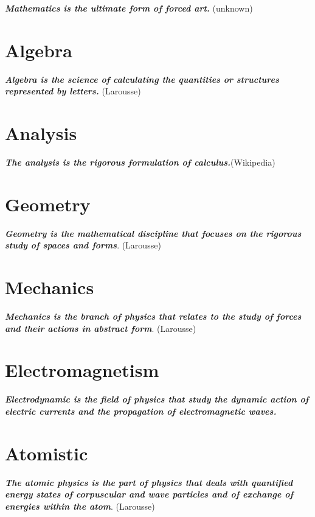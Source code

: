 \documentclass[12pt,a4paper,twoside,openright]{report}
\theoremstyle{definition}
\theoremstyle{itexmp}
\numberwithin{equation}{section}
\begin{document}
	\textit{\textbf{Mathematics is the ultimate form of forced art.}} (unknown)
	\minitoc
	
	
	
  \chapter{Algebra}

	\textit{\textbf{Algebra is the science of calculating the quantities or structures represented by letters.}} (Larousse)
	\minitoc
	
	
		
 \chapter{Analysis}

	\textit{\textbf{The analysis is the rigorous formulation of calculus.}}(Wikipedia)
	\minitoc
	\pagebreak
	
		
\chapter{Geometry}

	\textit{\textbf{Geometry is the mathematical discipline that focuses on the rigorous study of spaces and forms}}. (Larousse)
	\minitoc
	\pagebreak
	
	
   \chapter{Mechanics}

	\textit{\textbf{Mechanics is the branch of physics that relates to the study of forces and their actions in abstract form}}. (Larousse)
	\minitoc
	
	
\chapter{Electromagnetism}

	\textit{\textbf{Electrodynamic is the field of physics that study the dynamic action of electric currents and the propagation of electromagnetic waves.}}
	\minitoc
	\pagebreak
	

\chapter{Atomistic}

	\textit{\textbf{The atomic physics is the part of physics that deals with quantified energy states of corpuscular and wave particles and of exchange of energies within the atom}}. (Larousse)
	\minitoc
	\pagebreak
	
	
\end{document}
